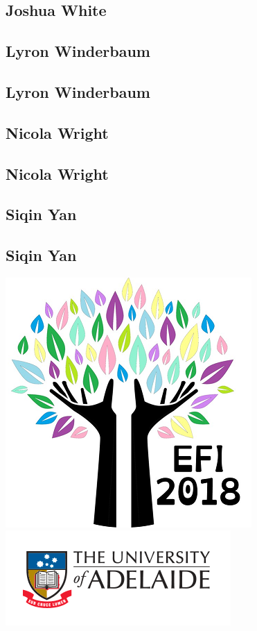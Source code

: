 \documentclass[twoside,14pt,a4paper,notitlepage]{memoir}
\begin{document}
\lipsum[1-2]
\subsection*{Joshua White}
\lipsum[3]



\subsection*{Lyron Winderbaum}
\label{aut:winderbaum}

\lipsum[1-2]
\subsection*{Lyron Winderbaum}
\lipsum[3]



\subsection*{Nicola Wright}
\label{aut:wright}

\lipsum[1-2]
\subsection*{Nicola Wright}
\lipsum[3]



\subsection*{Siqin Yan}
\label{aut:yan}

\lipsum[1-2]
\subsection*{Siqin Yan}
\lipsum[3]



\vfill
\includegraphics[scale=0.5]{colour_tree.png}
\hfill
\includegraphics[scale=1]{uoa-logo-col-horiz.png}
\end{document}
